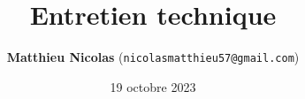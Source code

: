 \documentclass[10pt]{beamer}
\author{
  \textbf{Matthieu Nicolas} (\texttt{nicolasmatthieu57@gmail.com})
}
\date{19 octobre 2023}
\title{Entretien technique}
\begin{document}
\begin{frame}[t,plain]
  \maketitle
\end{frame}







% 
% 
% 
% 
% 
% 
% 
\end{document}
